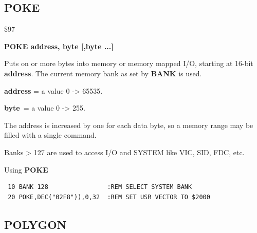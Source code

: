 \subsection{POKE}
\begin{description}[leftmargin=2cm,style=nextline]
\item [Token:] \$97
\item [Format:] {\bf POKE address, byte [,byte ...] }
\item [Usage:]  Puts on or more bytes into memory
                or memory mapped I/O, starting at
                16-bit {\bf address}.
                The current memory bank as set by {\bf BANK} is used.

                {\bf address} = a value 0 -> 65535.

                {\bf byte} = a value 0 -> 255.

\item [Remarks:] The address is increased by one for each data byte,
                 so a memory range may be filled with a single command.

                 Banks > 127 are used to access I/O and SYSTEM
                 like VIC, SID, FDC, etc.
\item [Example:] Using {\bf POKE}

\begin{tcolorbox}[colback=black,coltext=white]
\verbatimfont{\codefont}
\begin{verbatim}
 10 BANK 128                :REM SELECT SYSTEM BANK
 20 POKE,DEC("02F8")),0,32  :REM SET USR VECTOR TO $2000
\end{verbatim}
\end{tcolorbox}
\end{description}


\newpage
\subsection{POLYGON}


